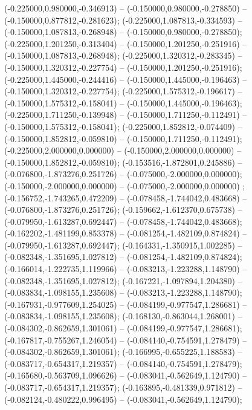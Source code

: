  (-0.225000,0.980000,-0.346913) -- (-0.150000,0.980000,-0.278850) -- (-0.150000,0.877812,-0.281623);
 (-0.225000,1.087813,-0.334593) -- (-0.150000,1.087813,-0.268948) -- (-0.150000,0.980000,-0.278850);
 (-0.225000,1.201250,-0.313404) -- (-0.150000,1.201250,-0.251916) -- (-0.150000,1.087813,-0.268948);
 (-0.225000,1.320312,-0.283345) -- (-0.150000,1.320312,-0.227754) -- (-0.150000,1.201250,-0.251916);
 (-0.225000,1.445000,-0.244416) -- (-0.150000,1.445000,-0.196463) -- (-0.150000,1.320312,-0.227754);
 (-0.225000,1.575312,-0.196617) -- (-0.150000,1.575312,-0.158041) -- (-0.150000,1.445000,-0.196463);
 (-0.225000,1.711250,-0.139948) -- (-0.150000,1.711250,-0.112491) -- (-0.150000,1.575312,-0.158041);
 (-0.225000,1.852812,-0.074409) -- (-0.150000,1.852812,-0.059810) -- (-0.150000,1.711250,-0.112491);
 (-0.225000,2.000000,0.000000) -- (-0.150000,2.000000,0.000000) -- (-0.150000,1.852812,-0.059810);
 (-0.153516,-1.872801,0.245886) -- (-0.076800,-1.873276,0.251726) -- (-0.075000,-2.000000,0.000000);
 (-0.150000,-2.000000,0.000000) -- (-0.075000,-2.000000,0.000000) ;
 (-0.156752,-1.743265,0.472209) -- (-0.078458,-1.744042,0.483668) -- (-0.076800,-1.873276,0.251726);
 (-0.159662,-1.612370,0.675738) -- (-0.079950,-1.613287,0.692447) -- (-0.078458,-1.744042,0.483668);
 (-0.162202,-1.481199,0.853378) -- (-0.081254,-1.482109,0.874824) -- (-0.079950,-1.613287,0.692447);
 (-0.164331,-1.350915,1.002285) -- (-0.082348,-1.351695,1.027812) -- (-0.081254,-1.482109,0.874824);
 (-0.166014,-1.222735,1.119966) -- (-0.083213,-1.223288,1.148790) -- (-0.082348,-1.351695,1.027812);
 (-0.167221,-1.097894,1.204380) -- (-0.083834,-1.098155,1.235608) -- (-0.083213,-1.223288,1.148790);
 (-0.167931,-0.977609,1.254025) -- (-0.084199,-0.977547,1.286681) -- (-0.083834,-1.098155,1.235608);
 (-0.168130,-0.863044,1.268001) -- (-0.084302,-0.862659,1.301061) -- (-0.084199,-0.977547,1.286681);
 (-0.167817,-0.755267,1.246054) -- (-0.084140,-0.754591,1.278479) -- (-0.084302,-0.862659,1.301061);
 (-0.166995,-0.655225,1.188583) -- (-0.083717,-0.654317,1.219357) -- (-0.084140,-0.754591,1.278479);
 (-0.165680,-0.563709,1.096626) -- (-0.083041,-0.562649,1.124790) -- (-0.083717,-0.654317,1.219357);
 (-0.163895,-0.481339,0.971812) -- (-0.082124,-0.480222,0.996495) -- (-0.083041,-0.562649,1.124790);
